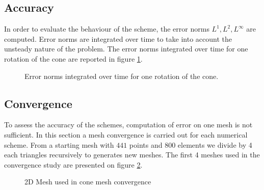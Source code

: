 \subsection{Accuracy}

In order to evaluate the behaviour of the scheme, the error norms $L^1, L^2, L^{\infty}$ are computed.
Error norms are integrated over time to take into account the unsteady nature of the problem.
The error norms integrated over time for one rotation of the cone are reported in figure \ref{t2d:cone:error_timeintegrals}.

\begin{figure}[H]
\centering
{}
\caption{Error norms integrated over time for one rotation of the cone.}
\label{t2d:cone:error_timeintegrals}
\end{figure}

\newpage
\subsection{Convergence}
To assess the accuracy of the schemes, computation of error on one mesh is not sufficient.
In this section a mesh convergence is carried out for each numerical scheme. From a starting mesh
with $441$ points and $800$ elements we divide by 4 each triangles recursively to generates new meshes.
The first 4 meshes used in the convergence study are presented on figure \ref{t2d:cone:meshes}. 

\begin{figure}[h!]
\begin{minipage}[t]{0.5\textwidth}
 \centering
\end{minipage}%
\begin{minipage}[t]{0.5\textwidth}
 \centering
\end{minipage}
\begin{minipage}[t]{0.5\textwidth}
 \centering
\end{minipage}%
\begin{minipage}[t]{0.5\textwidth}
 \centering
\end{minipage}
 \caption{2D Mesh used in cone mesh convergence}
 \label{t2d:cone:meshes}
\end{figure}

